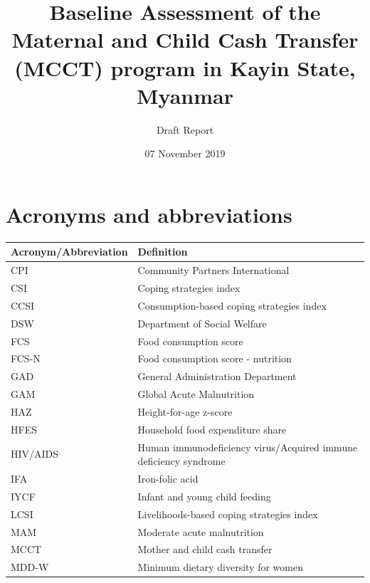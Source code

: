 \documentclass[12pt,a4paper]{article}
\title{\vspace{8cm} \LARGE{Baseline Assessment of the Maternal and Child Cash Transfer (MCCT) program in Kayin State, Myanmar}}
\subtitle{Draft Report}
\author{}
\date{07 November 2019}
\begin{document}
\maketitle

\newpage

{
\hypersetup{linkcolor=black}
\setcounter{tocdepth}{4}
\tableofcontents
}
\listoftables
\listoffigures
\newpage

\hypertarget{acronyms-and-abbreviations}{%
\section*{Acronyms and abbreviations}\label{acronyms-and-abbreviations}}

\begin{table}[H]
\centering
\begin{tabular}{l>{\raggedright\arraybackslash}p{8cm}}
\toprule
\textbf{Acronym/Abbreviation} & \textbf{Definition}\\
\midrule
\rowcolor{gray!6}  CPI & Community Partners International\\
CSI & Coping strategies index\\
\rowcolor{gray!6}  CCSI & Consumption-based coping strategies index\\
DSW & Department of Social Welfare\\
\rowcolor{gray!6}  FCS & Food consumption score\\
\addlinespace
FCS-N & Food consumption score - nutrition\\
\rowcolor{gray!6}  GAD & General Administration Department\\
GAM & Global Acute Malnutrition\\
\rowcolor{gray!6}  HAZ & Height-for-age z-score\\
HFES & Household food expenditure share\\
\addlinespace
\rowcolor{gray!6}  HIV/AIDS & Human immunodeficiency virus/Acquired immune deficiency syndrome\\
IFA & Iron-folic acid\\
\rowcolor{gray!6}  IYCF & Infant and young child feeding\\
LCSI & Livelihoods-based coping strategies index\\
\rowcolor{gray!6}  MAM & Moderate acute malnutrition\\
\addlinespace
MCCT & Mother and child cash transfer\\
\rowcolor{gray!6}  MDD-W & Minimum dietary diversity for women\\

\end{tabular}
\end{table}
\end{document}
